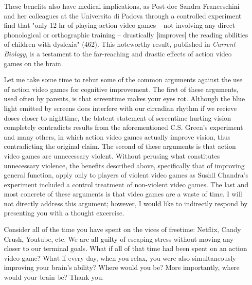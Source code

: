 \documentclass[12pt]{article}
\begin{document}
\begin{flushleft}
These benefits also have medical implications, as Post-doc Sandra Franceschini and her colleagues at the Universita di Padova through a controlled experiment find that "only 12 hr of playing action video games -- not involving any direct phonological or orthographic training -- drastically [improves] the reading abilities of children with dyslexia" (462). This noteworthy result, published in \emph{Current Biology}, is a testament to the far-reaching and drastic effects of action video games on the brain.

Let me take some time to rebut some of the common arguments against the use of action video games for cognitive improvement. The first of these arguments, used often by parents, is that screentime makes your eyes rot. Although the blue light emitted by screens does interfere with our circadian rhythm if we recieve doses closer to nighttime, the blatent statement of screentime hurting vision completely contradicts results from the aforementioned C.S. Green's experiment and many others, in which action video games actually improve vision, thus contradicting the original claim. The second of these arguments is that action video games are unnecessary violent. Without perusing what constitutes unnecessary violence, the benefits described above, specifically that of improving general function, apply only to players of violent video games as Sushil Chandra's experiment included a control treatment of non-violent video games. The last and most concrete of these arguments is that video games are a waste of time. I will not directly address this argument; however, I would like to indirectly respond by presenting you with a thought excercise.

Consider all of the time you have spent on the vices of freetime: Netflix, Candy Crush, Youtube, etc. We are all guilty of escaping stress without moving any closer to our terminal goals. What if all of that time had been spent on an action video game? What if every day, when you relax, you were also simultaneously improving your brain's ability? Where would you be? More importantly, where would your brain be? Thank you.
\end{flushleft}
\end{document}
